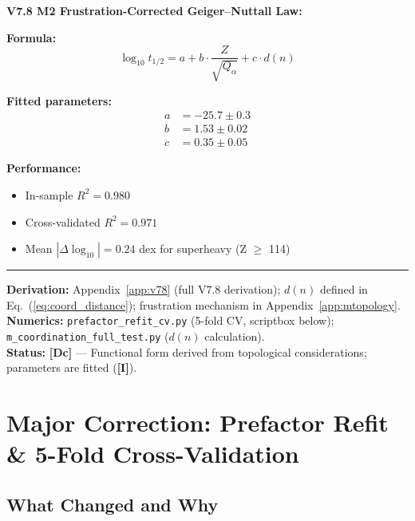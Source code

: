 \documentclass[11pt,a4paper]{article}
\newcommand{\tagI}{\textcolor{orange!80!black}{\textbf{[I]}}}
\newcommand{\tagDc}{\textcolor{blue!70!black}{\textbf{[Dc]}}}
\begin{document}
\begin{resultbox}
\textbf{V7.8 M2 Frustration-Corrected Geiger--Nuttall Law:}

\textbf{Formula:}
\begin{equation}
    \log_{10} t_{1/2} = a + b \cdot \frac{Z}{\sqrt{Q_\alpha}} + c \cdot d(n)
    \label{eq:v78_m2}
\end{equation}

\textbf{Fitted parameters:}
\begin{align}
    a &= -25.7 \pm 0.3 \\
    b &= 1.53 \pm 0.02 \\
    c &= 0.35 \pm 0.05
\end{align}

\textbf{Performance:}
\begin{itemize}[nosep]
    \item In-sample $R^2 = 0.980$
    \item Cross-validated $R^2 = 0.971$
    \item Mean $|\Delta \log_{10}| = 0.24$ dex for superheavy (Z $\geq$ 114)
\end{itemize}

\vspace{0.3em}\hrule\vspace{0.3em}
\textbf{Derivation:} Appendix~\ref{app:v78} (full V7.8 derivation); $d(n)$ defined in Eq.~(\ref{eq:coord_distance}); frustration mechanism in Appendix~\ref{app:mtopology}.\\
\textbf{Numerics:} \texttt{prefactor\_refit\_cv.py} (5-fold CV, scriptbox below); \texttt{m\_coordination\_full\_test.py} ($d(n)$ calculation).\\
\textbf{Status:} \tagDc{} --- Functional form derived from topological considerations; parameters are fitted (\tagI{}).
\end{resultbox}

\section{Major Correction: Prefactor Refit \& 5-Fold Cross-Validation}
\label{sec:prefactor_refit}

\subsection{What Changed and Why}
\end{document}
